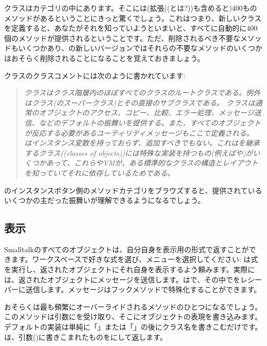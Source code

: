 \documentclass[a4paper,10pt,twoside]{book}
\begin{document}
クラスはカテゴリの中にあります。そこには(拡張((とは?))も含めると)400ものメソッドがあるということにきっと驚くでしょう。これはつまり、新しいクラスを定義すると、あなたがそれを知っていようといまいと、すべてに自動的に400個のメソッドが提供されるということです。ただ、削除されるべき不要なメソッドもいくつかあり、\pharo の新しいバージョンではそれらの不要なメソッドのいくつかはおそらく削除されることになることを覚えておきましょう。

クラスのクラスコメントには次のように書かれています:

\begin{quote}
\textit{クラスはクラス階層内のほぼすべてのクラスのルートクラスである。例外はクラス(のスーパークラス)とその直接のサブクラスである。
クラスは通常のオブジェクトのアクセス、コピー、比較、エラー処理、メッセージ送信、などのデフォルトの振舞いを提供する。また、すべてのオブジェクトが反応する必要があるユーティリティメッセージもここで定義される。
はインスタンス変数を持っておらず、追加すべきでもない。これはを継承するクラス((classes of objects))には特殊な実装を持つもの(例えばや)がいくつかあって、これらやVMが、ある標準的なクラスの構造とレイアウトを知っていてそれに依存しているためである。}
\end{quote}

のインスタンスボタン側のメソッドカテゴリをブラウズすると、提供されているいくつかの主だった振舞いが理解できるようになるでしょう。

\subsection{表示}
Smalltalkのすべてのオブジェクトは、自分自身を表示用の形式で返すことができます。ワークスペースで好きな式を選び、メニューを選択してください: は式を実行し、返されたオブジェクトにそれ自身を表示するよう頼みます。実際には、返されたオブジェクトにメッセージを送信します。はで、その中でをレシーバーに送信します。メッセージはフックメソッドで特殊化することができます。

おそらくは最も頻繁にオーバーライドされるメソッドのひとつになるでしょう。このメソッドは引数にを受け取り、そこにオブジェクトの表現を書き込みます。デフォルトの実装は単純に「」または「」の後にクラス名を書きこむだけです。は、引数()に書きこまれたものをにして返します。
\end{document}
